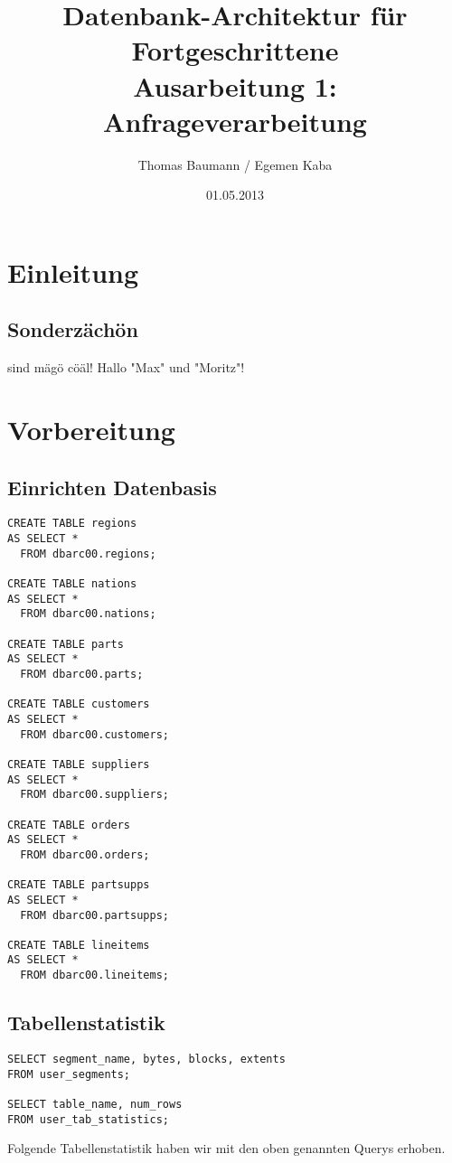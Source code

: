 \documentclass[10pt]{article}
\title{
	\vspace{4cm}
	\huge{Datenbank-Architektur für Fortgeschrittene}\\
	\vspace{0.2cm}
	\Large{Ausarbeitung 1: Anfrageverarbeitung}\\
}
\author{Thomas Baumann / Egemen Kaba}
\date{01.05.2013}
\begin{document}
\maketitle
\thispagestyle{fancy}

\newpage

\tableofcontents	  	


\newpage
\setcounter{page}{1}


\section{Einleitung}
\subsection{Sonderzächön}
sind mägö cöäl! Hallo "Max" und "Moritz"!
\section{Vorbereitung}
\subsection{Einrichten Datenbasis}
\begin{lstlisting}[style=sql]
CREATE TABLE regions
AS SELECT *
  FROM dbarc00.regions;
  
CREATE TABLE nations
AS SELECT *
  FROM dbarc00.nations;

CREATE TABLE parts
AS SELECT *
  FROM dbarc00.parts;
  
CREATE TABLE customers
AS SELECT *
  FROM dbarc00.customers;

CREATE TABLE suppliers
AS SELECT *
  FROM dbarc00.suppliers;

CREATE TABLE orders
AS SELECT *
  FROM dbarc00.orders;

CREATE TABLE partsupps
AS SELECT *
  FROM dbarc00.partsupps;

CREATE TABLE lineitems
AS SELECT *
  FROM dbarc00.lineitems;
\end{lstlisting}
\subsection{Tabellenstatistik}
\begin{lstlisting}[style=sql]
SELECT segment_name, bytes, blocks, extents
FROM user_segments;

SELECT table_name, num_rows
FROM user_tab_statistics;
\end{lstlisting}
Folgende Tabellenstatistik haben wir mit den oben genannten Querys erhoben.
\end{document}
